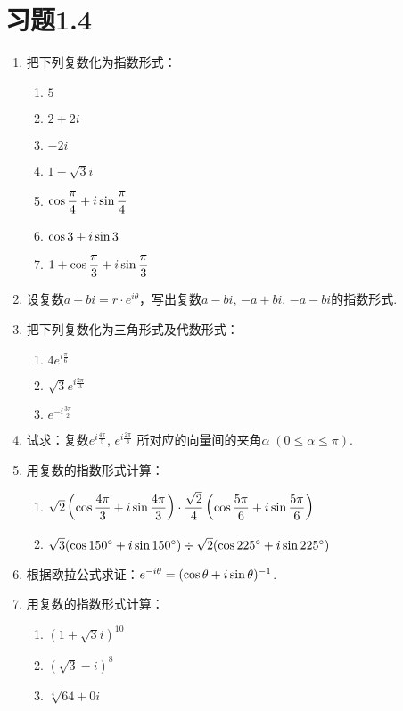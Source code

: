 \section*{习题1.4}
\begin{enumerate}
    \item 把下列复数化为指数形式：
\begin{multicols}{3}
\begin{enumerate}[(1)]
    \item $5$
    \item $2+2i$
    \item $-2i$
    \item $1-\sqrt{3}i$
    \item $\cos{\dfrac{\pi}{4}}+i\sin{\dfrac{\pi}{4}}$
    \item $\cos{3}+i\sin{3}$
    \item $1+\cos{\dfrac{\pi}{3}}+i\sin{\dfrac{\pi}{3}}$
\end{enumerate}
\end{multicols}
\item 设复数$a+bi=r\cdot e^{i\theta}$，写出复数$a-bi$, $-a+bi$, $-a-bi$的指数形式.
\item 把下列复数化为三角形式及代数形式：
\begin{multicols}{3}
\begin{enumerate}[(1)]
    \item $4e^{i\tfrac{\pi}{6}}$
    \item $\sqrt{3}e^{i\tfrac{2\pi}{3}}$
    \item $e^{-i\tfrac{3\pi}{2}}$
\end{enumerate}
\end{multicols}

\item 试求：复数$e^{i\tfrac{4\pi}{5}}$, $e^{i\tfrac{2\pi}{3}}$ 所对应的向量间的夹角$\alpha\; (0\le \alpha\le \pi)$.
\item 用复数的指数形式计算：
\begin{enumerate}[(1)]
    \item $\sqrt{2}\left(\cos{\dfrac{4\pi}{3}}+i\sin{\dfrac{4\pi}{3}}\right)\cdot\dfrac{\sqrt{2}}{4}\left(\cos{\dfrac{5\pi}{6}}+i\sin{\dfrac{5\pi}{6}}\right)$
    \item $\sqrt{3}(\cos{150^{\circ}}+i\sin{150^{\circ}})\div \sqrt{2}(\cos{225^{\circ}}+i\sin{225^{\circ}})$
\end{enumerate}

\item 根据欧拉公式求证：$e^{-i\theta}=(\cos{\theta}+i\sin{\theta})^{-1}$.

\item 用复数的指数形式计算：
\begin{multicols}{3}
\begin{enumerate}[(1)]
    \item $(1+\sqrt{3}i)^{10}$
    \item $(\sqrt{3}-i)^8$
    \item $\sqrt[4]{64+0i}$
\end{enumerate}
\end{multicols}


\end{enumerate}
